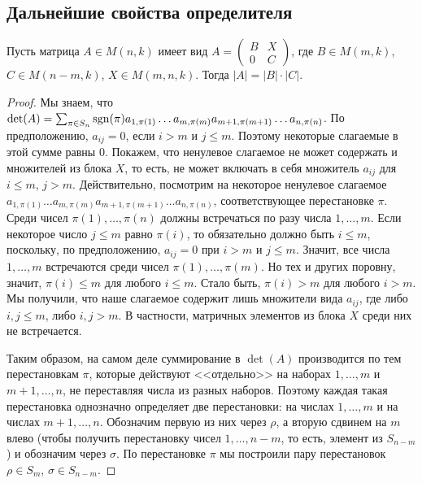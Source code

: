 \subsection{Дальнейшие свойства определителя}

\begin{theorem}\label{thm_det_block_ut}
Пусть матрица $A\in M(n,k)$ имеет вид
$A=\begin{pmatrix}B & X\\0 & C\end{pmatrix}$, где
$B\in M(m,k)$, $C\in M(n-m,k)$, $X\in M(m,n,k)$. Тогда $|A|=|B|\cdot
|C|$.
\end{theorem}
\begin{proof}
Мы знаем, что $\det(A)=\sum_{\pi\in S_n}\operatorname{sgn}(\pi)a_{1,\pi(1)}\dots a_{m,\pi(m)}
a_{m+1,\pi(m+1)} \dots a_{n,\pi(n)}$.
По предположению, $a_{ij}=0$, если $i>m$ и $j\leq m$. Поэтому
некоторые слагаемые в этой сумме равны $0$. Покажем, что ненулевое
слагаемое не может содержать и множителей из блока $X$, то есть, не
может включать в себя множитель $a_{ij}$ для $i\leq m$, $j>m$.
Действительно, посмотрим на некоторое ненулевое слагаемое
$a_{1,\pi(1)}\dots a_{m,\pi(m)} a_{m+1,\pi(m+1)}\dots a_{n,\pi(n)}$,
соответствующее перестановке $\pi$.
Среди чисел $\pi(1),\dots,\pi(n)$ должны встречаться по разу числа
$1,\dots,m$. Если некоторое число $j\leq m$ равно $\pi(i)$, то
обязательно должно быть $i\leq m$, поскольку, по предположению,
$a_{ij}=0$ при $i>m$ и $j\leq m$. Значит, все числа $1,\dots,m$
встречаются среди чисел $\pi(1),\dots,\pi(m)$. Но тех и других
поровну, значит, $\pi(i)\leq m$ для любого $i\leq m$. Стало быть,
$\pi(i)>m$ для любого $i>m$. Мы получили, что наше слагаемое содержит
лишь множители вида $a_{ij}$, где либо $i,j\leq m$, либо $i,j>m$. В
частности, матричных элементов из блока $X$ среди них не встречается.

Таким образом, на самом деле суммирование в $\det(A)$ производится по
тем перестановкам $\pi$, которые действуют <<отдельно>> на наборах
$1,\dots,m$ и $m+1,\dots,n$, не переставляя числа из разных
наборов. Поэтому каждая такая перестановка однозначно определяет две
перестановки: на числах $1,\dots,m$ и на числах
$m+1,\dots,n$. Обозначим первую из них через $\rho$, а вторую сдвинем
на $m$ влево (чтобы получить перестановку чисел $1,\dots,n-m$, то
есть, элемент из $S_{n-m}$) и обозначим через $\sigma$. По
перестановке $\pi$ мы построили пару перестановок $\rho\in S_m$,
$\sigma\in S_{n-m}$.


\end{proof}
